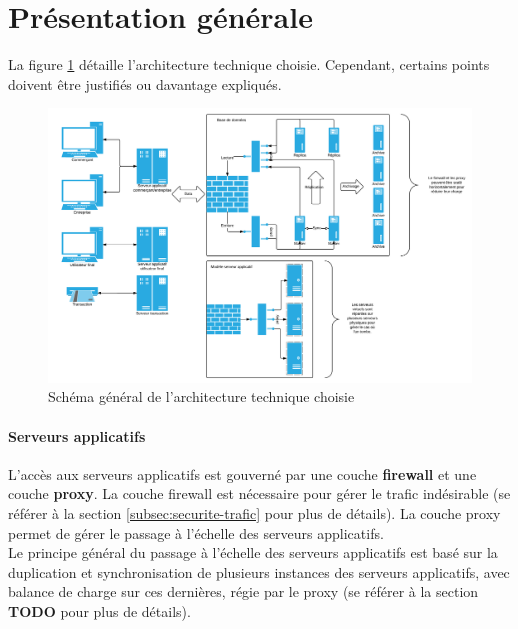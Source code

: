 




\section{Présentation générale}

La figure \ref{fig:network} détaille l'architecture technique choisie.
Cependant, certains points doivent être justifiés ou davantage expliqués.

\begin{figure}[htpb]
    \centering
    \includegraphics[width=\textwidth]{network}
    \caption{Schéma général de l'architecture technique choisie}
    \label{fig:network}
\end{figure}

\paragraph{Serveurs applicatifs}

L'accès aux serveurs applicatifs est gouverné par une couche \textbf{firewall}
et une couche \textbf{proxy}. La couche firewall est nécessaire pour gérer le
trafic indésirable (se référer à la section
\ref{subsec:securite-trafic} pour plus de détails). La couche proxy
permet de gérer le passage à l'échelle des serveurs applicatifs. \\

Le principe général du passage à l'échelle des serveurs applicatifs est basé
sur la duplication et synchronisation de plusieurs instances des serveurs
applicatifs, avec balance de charge sur ces dernières, régie par le proxy (se
référer à la section {\huge \textbf{TODO} } pour plus de détails).

